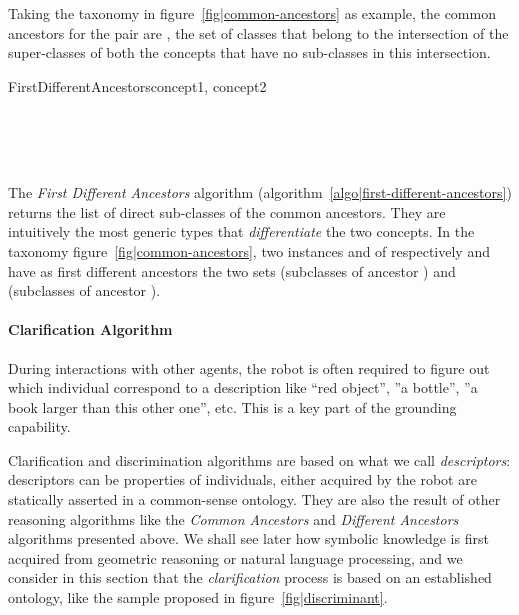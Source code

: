 Taking the taxonomy in figure~\ref{fig|common-ancestors} as example, the common
ancestors for the pair  are
, \ie the set of classes that belong to
the intersection of the super-classes of both the concepts that have no
sub-classes in this intersection.

\small
\begin{pseudocode}[ruled]{FirstDifferentAncestors}{concept1, concept2}
\label{algo|first-different-ancestors}

\BEGIN
{} \GETS {} \\
 \GETS {} \cup {} \\

 \\
\END

\end{pseudocode}
\normalsize

The \emph{First Different Ancestors} algorithm
(algorithm~\ref{algo|first-different-ancestors}) returns the list of direct
sub-classes of the common ancestors. They are intuitively the most generic
types that \emph{differentiate} the two concepts. In the taxonomy
figure~\ref{fig|common-ancestors}, two instances  and  of
respectively  and  have as first different
ancestors the two sets  (subclasses of ancestor
) and  (subclasses of
ancestor ).

\paragraph{Clarification Algorithm}
\label{sect|clarify}

During interactions with other agents, the robot is often required to figure
out which individual correspond to a description like ``red object'', ''a
bottle'', ''a book larger than this other one'', etc. This is a key part of the
grounding capability.

Clarification and discrimination algorithms are based on what we call
\emph{descriptors}: descriptors can be properties of individuals, either
acquired by the robot are statically asserted in a common-sense ontology. They
are also the result of other reasoning algorithms like the \emph{Common
Ancestors} and \emph{Different Ancestors} algorithms presented above.
We shall see later how symbolic knowledge is first acquired from geometric
reasoning or natural language processing, and we consider in this section that
the \emph{clarification} process is based on an established ontology, like the
sample proposed in figure~\ref{fig|discriminant}.

